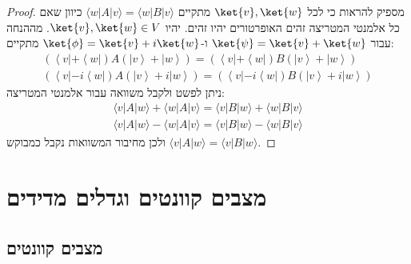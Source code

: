 \documentclass{tstextbook}
\begin{document}
\begin{proof}
מספיק להראות כי לכל \(\ket{v},\ket{w}\) מתקיים \(\langle w|A|v \rangle=\langle w|B|v \rangle\) כיוון שאם כל אלמנטי המטריצה זהים האופרטורים יהיו זהים.
יהיו \(\ket{v},\ket{w}\in V\). מההנחה עבור \(\ket{\psi}=\ket{v}+\ket{w}\) ו-\(\ket{\phi}=\ket{v}+i\ket{w}\) מתקיים:
\begin{gather*}\left(\left\langle  v|+\left\langle  w|\right)A\left(|v \right\rangle+|w \right\rangle\right)=\left(\left\langle  v|+\left\langle  w|\right)B\left(|v \right\rangle+|w \right\rangle\right)\\\left(\left\langle  v|-i\left\langle  w|\right)A\left(|v \right\rangle+i|w \right\rangle\right)=\left(\left\langle  v|-i\left\langle  w|\right)B\left(|v \right\rangle+i|w \right\rangle\right) 
\end{gather*}
ניתן לפשט ולקבל משוואה עבור אלמנטי המטריצה:
\begin{gather*}\langle v|A|w\rangle+\langle w|A|v\rangle=\langle v|B|w\rangle+\langle w|B|v\rangle \\\langle v|A|w\rangle-\langle w|A|v\rangle=\langle v|B|w\rangle-\langle w|B|v\rangle
\end{gather*}
ולכן מחיבור המשוואות נקבל כמבוקש \(\langle v|A|w \rangle=\langle v|B|w \rangle\).

\end{proof}

\section{מצבים קוונטים וגדלים מדידים}

\subsection{מצבים קוונטים}
\end{document}
